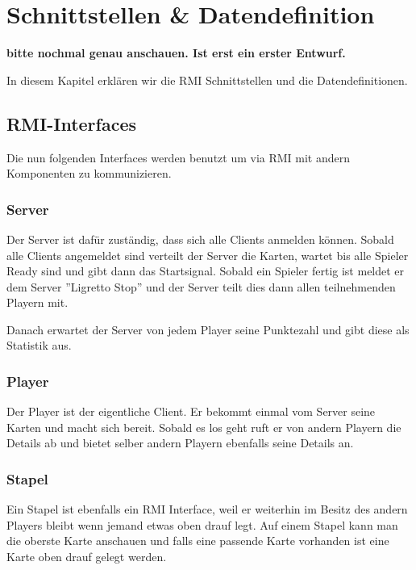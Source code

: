 \section{Schnittstellen \& Datendefinition} 

\color{red}
\textbf{bitte nochmal genau anschauen. Ist erst ein erster Entwurf.}
\color{black}

In diesem Kapitel erklären wir die RMI Schnittstellen und die Datendefinitionen.

\subsection{RMI-Interfaces}

Die nun folgenden Interfaces werden benutzt um via RMI mit andern Komponenten zu kommunizieren.

\subsubsection{Server}

Der Server ist dafür zuständig, dass sich alle Clients anmelden können. Sobald alle Clients angemeldet sind verteilt der Server die Karten, wartet bis alle Spieler Ready sind und gibt dann das Startsignal. Sobald ein Spieler fertig ist meldet er dem Server ''Ligretto Stop'' und der Server teilt dies dann allen teilnehmenden Playern mit. 

Danach erwartet der Server von jedem Player seine Punktezahl und gibt diese als Statistik aus.



\subsubsection{Player}

Der Player ist der eigentliche Client. Er bekommt einmal vom Server seine Karten und macht sich bereit. Sobald es los geht ruft er von andern Playern die Details ab und bietet selber andern Playern ebenfalls seine Details an.



\subsubsection{Stapel}

Ein Stapel ist ebenfalls ein RMI Interface, weil er weiterhin im Besitz des andern Players bleibt wenn jemand etwas oben drauf legt. Auf einem Stapel kann man die oberste Karte anschauen und falls eine passende Karte vorhanden ist eine Karte oben drauf gelegt werden.



